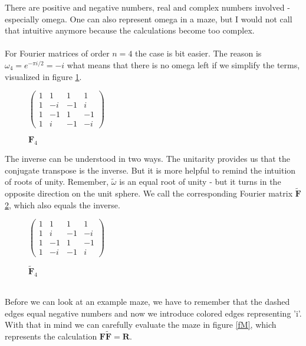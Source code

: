\documentclass[oneside]{thesisclass}
\begin{document}
There are positive and negative numbers, real and complex numbers involved - especially omega.
One can also represent omega in a maze, but I would not call that intuitive anymore because the calculations become too complex.\\
\\For Fourier matrices of order $n = 4$ the case is bit easier.
The reason is $\omega _4 = e^{-\pi i/2} = -i$ what means that there is no omega left if we simplify the terms, visualized in figure \ref{f4}.
\begin{figure}
 \begin{center}
  $
  \begin{pmatrix}
  1 & 1 & 1 & 1 \\
  1 & -i & -1 & i \\
  1 & -1 & 1 & -1 \\
  1 & i & -1 & -i
  \end{pmatrix}
  $
  \caption{$\mathbf F_4$}
  \label{f4}
 \end{center}
\end{figure}
The inverse can be understood in two ways.
The unitarity provides us that the conjugate transpose is the inverse.
But it is more helpful to remind the intuition of roots of unity.
Remember, $\tilde{\omega}$ is an equal root of unity - but it turns in the opposite direction on the unit sphere.
We call the corresponding Fourier matrix $\tilde{\mathbf F}$ \ref{fH}, which also equals the inverse.\\
 \begin{figure}
 \begin{center}
  $
  \begin{pmatrix}
  1 & 1 & 1 & 1 \\
  1 & i & -1 & -i \\
  1 & -1 & 1 & -1 \\
  1 & -i & -1 & i
  \end{pmatrix}
  $
  \caption{$\mathbf{\tilde F}_4$}
  \label{fH}
 \end{center}
\end{figure}
\\Before we can look at an example maze, we have to remember that the dashed edges equal negative numbers and now we introduce colored edges representing 'i'.
With that in mind we can carefully evaluate the maze in figure \ref{fM}, which represents the calculation $\mathbf F\tilde{\mathbf F} = \mathbf R$.
\end{document}
